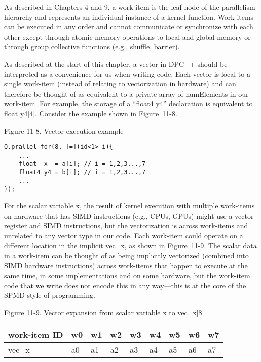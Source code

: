 As described in Chapters 4 and 9, a work-item is the leaf node of the parallelism hierarchy and represents an individual instance of a kernel function. Work-items can be executed in any order and cannot communicate or synchronize with each other except through atomic memory operations to local and global memory or through group collective functions (e.g., shuffle, barrier).\par

As described at the start of this chapter, a vector in DPC++ should be interpreted as a convenience for us when writing code. Each vector is local to a single work-item (instead of relating to vectorization in hardware) and can therefore be thought of as equivalent to a private array of numElements in our work-item. For example, the storage of a “float4 y4” declaration is equivalent to float y4[4]. Consider the example shown in Figure 11-8.\par

\hspace*{\fill} \par %
Figure 11-8. Vector execution example
\begin{lstlisting}[caption={}]
Q.prallel_for(8, [=](id<1> i){
	...
	float  x  = a[i]; // i = 1,2,3...,7
	float4 y4 = b[i]; // i = 1,2,3...,7
	...
});
\end{lstlisting}

For the scalar variable x, the result of kernel execution with multiple work-items on hardware that has SIMD instructions (e.g., CPUs, GPUs) might use a vector register and SIMD instructions, but the vectorization is across work-items and unrelated to any vector type in our code. Each work-item could operate on a different location in the implicit vec\_x, as shown in Figure 11-9. The scalar data in a work-item can be thought of as being implicitly vectorized (combined into SIMD hardware instructions) across work-items that happen to execute at the same time, in some implementations and on some hardware, but the work-item code that we write does not encode this in any way—this is at the core of the SPMD style of programming.\par

\hspace*{\fill} \par %
Figure 11-9. Vector expansion from scalar variable x to vec\_x[8]
\begin{table}[H]
	\begin{tabular}{|l|l|l|l|l|l|l|l|l|}
		\hline
		work-item ID & w0 & w1 & w2 & w3 & w4 & w5 & w6 & w7 \\ \hline
		vec\_x       & a0 & a1 & a2 & a3 & a4 & a5 & a6 & a7 \\ \hline
	\end{tabular}
\end{table}

